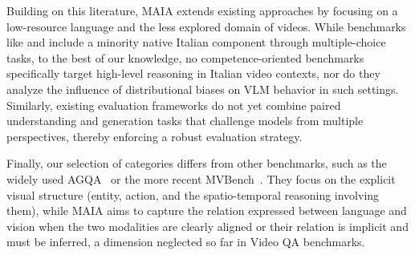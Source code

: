 Building on this literature, MAIA extends existing approaches by focusing on a low-resource language and the less explored domain of videos. While benchmarks like \citet{exams} and \citet{m3exam} include a minority native Italian component through multiple-choice tasks, to the best of our knowledge, no competence-oriented benchmarks specifically target high-level reasoning in Italian video contexts, nor do they analyze the influence of distributional biases on VLM behavior in such settings. Similarly, existing evaluation frameworks do not yet combine paired understanding and generation tasks that challenge models from multiple perspectives, thereby enforcing a robust evaluation strategy.


Finally, our selection of categories differs from other benchmarks, such as  the widely used AGQA~\cite{GrundeMcLaughlin2021AGQA} or the more recent MVBench~\cite{li:mvbench24}. They focus on the explicit visual structure (entity, action, and the spatio-temporal reasoning involving them), while MAIA  aims to capture the relation expressed  between language and vision when the two modalities are clearly aligned or their relation is implicit and must be inferred, a dimension neglected so far in Video QA benchmarks.  






